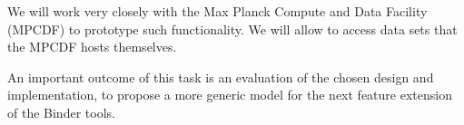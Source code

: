 \begin{task}
  We will work very closely with the Max Planck Compute and Data Facility
  (MPCDF) to prototype such functionality. We will allow to access data sets
  that the MPCDF hosts themselves.

  An important outcome of this task is an evaluation of the chosen design and
  implementation, to propose a more generic model for the next feature extension
  of the Binder tools.
\end{task}
